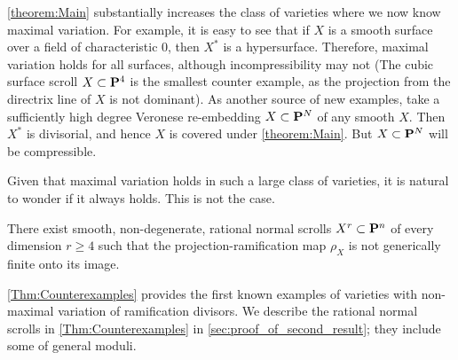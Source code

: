 \documentclass[11pt,reqno]{amsart}
\theoremstyle{plain}
\theoremstyle{definition}
\theoremstyle{remark}
\numberwithin{equation}{section}
\numberwithin{equation}{section}
\begin{document}
\autoref{theorem:Main} substantially increases the class of varieties where we now know maximal variation.
For example, it is easy to see that if $X$ is a smooth surface over a field of characteristic $0$, then $X^*$ is a hypersurface.
Therefore, maximal variation holds for all surfaces, although incompressibility may not (The cubic surface scroll $X \subset \P^4$ is the smallest counter example, as the projection from the directrix line of $X$ is not dominant).
As another source of new examples, take a sufficiently high degree Veronese re-embedding $X \subset \P^N$ of any smooth $X$.
Then $X^*$ is divisorial, and hence $X$ is covered under \autoref{theorem:Main}.
But $X \subset \P^N$ will be compressible.

Given that maximal variation holds in such a large class of varieties, it is natural to wonder if it always holds.
This is not the case.
\begin{maintheorem}
  \label{Thm:Counterexamples}
  There exist smooth, non-degenerate, rational normal scrolls $X^{r} \subset \P^{n}$ of every dimension $r \geq 4$ such that the projection-ramification map $\rho_{X}$ is not generically finite onto its image.
\end{maintheorem}
\autoref{Thm:Counterexamples} provides the first known examples of varieties with non-maximal variation of ramification divisors.
We describe the rational normal scrolls in \autoref{Thm:Counterexamples} in \autoref{sec:proof_of_second_result}; they include some of general moduli.
\end{document}
